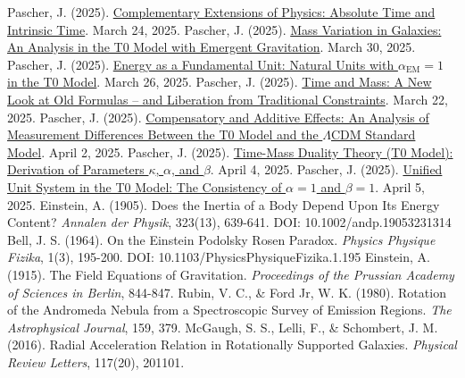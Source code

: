 \documentclass[12pt,a4paper]{article}
\newcommand{\alphaEM}{\alpha_{\text{EM}}}
\begin{document}
	\begin{thebibliography}{99}
		 Pascher, J. (2025). \href{https://github.com/jpascher/T0-Time-Mass-Duality/tree/main/2/pdf/English/Komplementäre Erweiterungen der Physik - Absolute Zeit und Intrinsische Zeit_en.pdf}{Complementary Extensions of Physics: Absolute Time and Intrinsic Time}. March 24, 2025.
		 Pascher, J. (2025). \href{https://github.com/jpascher/T0-Time-Mass-Duality/tree/main/2/pdf/English/Massenvariation in Galaxien_en.pdf}{Mass Variation in Galaxies: An Analysis in the T0 Model with Emergent Gravitation}. March 30, 2025.
		 Pascher, J. (2025). \href{https://github.com/jpascher/T0-Time-Mass-Duality/tree/main/2/pdf/English/Natürliche Einheiten mit Feinstrukturkonstante alpha = 1_en.pdf}{Energy as a Fundamental Unit: Natural Units with \(\alphaEM = 1\) in the T0 Model}. March 26, 2025.
		 Pascher, J. (2025). \href{https://github.com/jpascher/T0-Time-Mass-Duality/tree/main/2/pdf/English/Zeit und Masse Ein neuer Blick auf alte Formeln – und die Befreiung von traditionellen Fesseln_en.pdf}{Time and Mass: A New Look at Old Formulas – and Liberation from Traditional Constraints}. March 22, 2025.
		 Pascher, J. (2025). \href{https://github.com/jpascher/T0-Time-Mass-Duality/tree/main/2/pdf/English/Analyse der Messdifferenzen zwischen dem T0-Modell und dem Standardmodell_en.pdf}{Compensatory and Additive Effects: An Analysis of Measurement Differences Between the T0 Model and the \(\Lambda\)CDM Standard Model}. April 2, 2025.
		 Pascher, J. (2025). \href{https://github.com/jpascher/T0-Time-Mass-Duality/tree/main/2/pdf/English/Zeit-Masse-Dualitätstheorie (T0-Modell) Herleitung der Parameter kappa, alpha und beta_en.pdf}{Time-Mass Duality Theory (T0 Model): Derivation of Parameters \(\kappa\), \(\alpha\), and \(\beta\)}. April 4, 2025.
		 Pascher, J. (2025). \href{https://github.com/jpascher/T0-Time-Mass-Duality/tree/main/2/pdf/English/Die Konsistenz von alpha = 1 und beta = 1_en.pdf}{Unified Unit System in the T0 Model: The Consistency of \(\alpha = 1\) and \(\beta = 1\)}. April 5, 2025.
		 Einstein, A. (1905). Does the Inertia of a Body Depend Upon Its Energy Content? \textit{Annalen der Physik}, 323(13), 639-641. DOI: 10.1002/andp.19053231314
		 Bell, J. S. (1964). On the Einstein Podolsky Rosen Paradox. \textit{Physics Physique Fizika}, 1(3), 195-200. DOI: 10.1103/PhysicsPhysiqueFizika.1.195
		 Einstein, A. (1915). The Field Equations of Gravitation. \textit{Proceedings of the Prussian Academy of Sciences in Berlin}, 844-847.
		 Rubin, V. C., \& Ford Jr, W. K. (1980). Rotation of the Andromeda Nebula from a Spectroscopic Survey of Emission Regions. \textit{The Astrophysical Journal}, 159, 379.
		 McGaugh, S. S., Lelli, F., \& Schombert, J. M. (2016). Radial Acceleration Relation in Rotationally Supported Galaxies. \textit{Physical Review Letters}, 117(20), 201101.
	\end{thebibliography}
	
\end{document}
